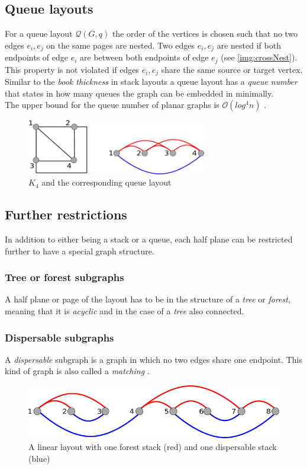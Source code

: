 \subsection{Queue layouts}
For a queue layout $\mathcal{Q}(G,q)$ the order of the vertices is chosen such that no two edges $e_i, e_j$ on the same pages are nested. Two edges $e_i, e_j$ are nested if both endpoints of edge $e_i$ are between both endpoints of edge $e_j$ (see \autoref{img:crossNest}). This property is not violated if edges $e_i, e_j$ share the same source or target vertex.\\
Similar to the \textit{book thickness} in stack layouts a queue layout has a \textit{queue number} that states in how many queues the graph can be embedded in minimally.\\
The upper bound for the queue number of planar graphs is $\mathcal{O}(log^4 n)$ \cite{di2013queue}.
\begin{figure}[!h]
\begin{center}
\includegraphics[width=0.7\textwidth]{figures/K4Queue.png}
\caption{$K_4$ and the corresponding queue layout}
\label{img:queueK4}
\end{center}
\end{figure}
\subsection{Further restrictions}
In addition to either being a stack or a queue, each half plane can be restricted further to have a special graph structure.
\subsubsection{Tree or forest subgraphs}
A half plane or page of the layout has to be in the structure of a \textit{tree} or \textit{forest}, meaning that it is \textit{acyclic} and in the case of a \textit{tree} also connected.
\subsubsection{Dispersable subgraphs}
A \textit{dispersable} subgraph is a graph in which no two edges share one endpoint. This kind of graph is also called a \textit{matching} \cite{kaufmann2018dispersable}. 
\begin{figure}[h!]
\begin{center}
\includegraphics[width=1\textwidth]{figures/ForestDisp.png}
\caption{A linear layout with one forest stack (red) and one dispersable stack (blue)}
\label{img:plzhltr}
\end{center}
\end{figure} 
